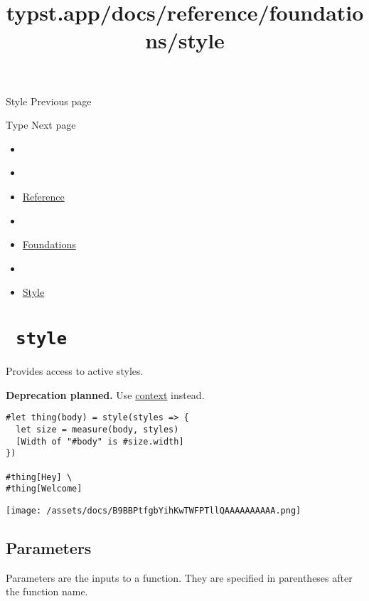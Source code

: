 { Style } { Previous page }

\href{/docs/reference/foundations/type/}{\pandocbounded{}}

{ Type } { Next page }


\title{typst.app/docs/reference/foundations/style}

\begin{itemize}
\tightlist
\item
  \href{/docs}{}
\item
  
\item
  \href{/docs/reference/}{Reference}
\item
  
\item
  \href{/docs/reference/foundations/}{Foundations}
\item
  
\item
  \href{/docs/reference/foundations/style/}{Style}
\end{itemize}

\section{\texorpdfstring{\texttt{\ style\ }}{ style }}\label{summary}

Provides access to active styles.

\textbf{Deprecation planned.} Use
\href{/docs/reference/context/}{context} instead.

\begin{verbatim}
#let thing(body) = style(styles => {
  let size = measure(body, styles)
  [Width of "#body" is #size.width]
})

#thing[Hey] \
#thing[Welcome]
\end{verbatim}

\texttt{[image: /assets/docs/B9BBPtfgbYihKwTWFPTllQAAAAAAAAAA.png]}

\subsection{\texorpdfstring{{ Parameters
}}{ Parameters }}\label{parameters}

\label{parameters-tooltip}
Parameters are the inputs to a function. They are specified in
parentheses after the function name.

